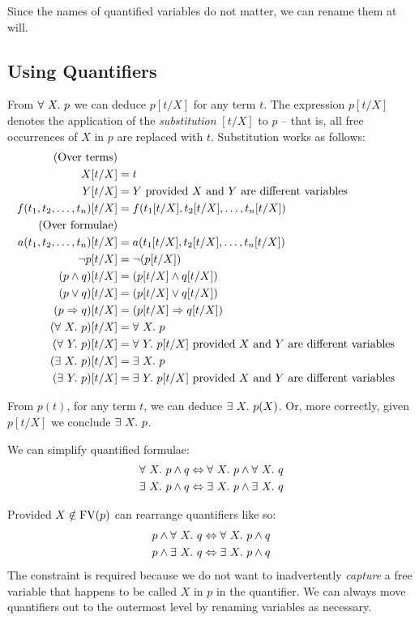 Since the names of quantified variables do not matter, we can rename
them at will.

\subsection{Using Quantifiers}

From $\forall\ X.\ p$ we can deduce $p[t/X]$ for any term $t$.  The
expression $p[t/X]$ denotes the application of the \emph{substitution}
$[t/X]$ to $p$ -- that is, all free occurrences of $X$ in $p$ are
replaced with $t$.  Substitution works as follows:
\begin{align*}
\text{(Over terms)} \\
X[t/X]
& = t \\
Y[t/X]
& = Y \text{ provided $X$ and $Y$ are different variables} \\
f(t_1, t_2, \ldots, t_n)[t/X]
& = f(t_1[t/X], t_2[t/X], \ldots, t_n[t/X]) \\
\text{(Over formulae)} \\
a(t_1, t_2, \ldots, t_n)[t/X]
& = a(t_1[t/X], t_2[t/X], \ldots, t_n[t/X]) \\
\neg{}p[t/X]
& = \neg{}(p[t/X]) \\
(p \wedge q)[t/X]
& = (p[t/X] \wedge q[t/X]) \\
(p \vee q)[t/X]
& = (p[t/X] \vee q[t/X]) \\
(p \Rightarrow q)[t/X]
& = (p[t/X] \Rightarrow q[t/X]) \\
(\forall\ X.\ p)[t/X]
& = \forall\ X.\ p \\
(\forall\ Y.\ p)[t/X]
& = \forall\ Y.\ p[t/X] \text{ provided $X$ and $Y$ are different variables} \\
(\exists\ X.\ p)[t/X]
& = \exists\ X.\ p \\
(\exists\ Y.\ p)[t/X]
& = \exists\ Y.\ p[t/X] \text{ provided $X$ and $Y$ are different variables} \\
\end{align*}

From $p(t)$, for any term $t$, we can deduce $\exists\ X.\ p(X)$.  Or, more
correctly, given $p[t/X]$ we conclude $\exists\ X.\ p$.

We can simplify quantified formulae:
\begin{align*}
\forall\ X.\ p \wedge q
& \Leftrightarrow \forall\ X.\ p \wedge \forall\ X.\ q\\
\exists\ X.\ p \wedge q
& \Leftrightarrow \exists\ X.\ p \wedge \exists\ X.\ q
\end{align*}

Provided $X \notin \text{FV}(p)$ can rearrange quantifiers like so:
\begin{align*}
p \wedge \forall\ X.\ q
& \Leftrightarrow \forall\ X.\ p \wedge q \\
p \wedge \exists\ X.\ q
& \Leftrightarrow \exists\ X.\ p \wedge q \\
\end{align*}
The constraint is required because we do not want to inadvertently
\emph{capture} a free variable that happens to be called $X$ in $p$ in
the quantifier.  We can always move quantifiers out to the outermost
level by renaming variables as necessary.

